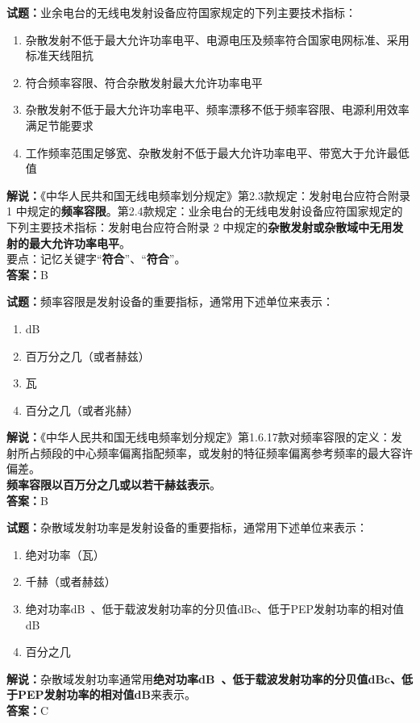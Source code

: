 \documentclass{ctexbook}
\begin{document}
\vspace{1em}

\textbf{试题：}业余电台的无线电发射设备应符国家规定的下列主要技术指标：
\begin{enumerate}[leftmargin=3em]
  \item 杂散发射不低于最大允许功率电平、电源电压及频率符合国家电网标准、采用标准天线阻抗
  \item 符合频率容限、符合杂散发射最大允许功率电平
  \item 杂散发射不低于最大允许功率电平、频率漂移不低于频率容限、电源利用效率满足节能要求
  \item 工作频率范围足够宽、杂散发射不低于最大允许功率电平、带宽大于允许最低值
\end{enumerate}
\noindent\textbf{解说：}《中华人民共和国无线电频率划分规定》第2.3款规定：发射电台应符合附录 1 中规定的\textbf{频率容限}。第2.4款规定：业余电台的无线电发射设备应符国家规定的下列主要技术指标：发射电台应符合附录 2 中规定的\textbf{杂散发射或杂散域中无用发射的最大允许功率电平}。\\要点：记忆关键字“\textbf{符合}”、“\textbf{符合}”。\\\noindent\textbf{答案：}B

\vspace{1em}

\textbf{试题：}频率容限是发射设备的重要指标，通常用下述单位来表示：
\begin{enumerate}[leftmargin=3em]
  \item dB
  \item 百万分之几（或者赫兹）
  \item 瓦
  \item 百分之几（或者兆赫）
\end{enumerate}
\noindent\textbf{解说：}《中华人民共和国无线电频率划分规定》第1.6.17款对频率容限的定义：发射所占频段的中心频率偏离指配频率，或发射的特征频率偏离参考频率的最大容许偏差。\\\textbf{频率容限以百万分之几或以若干赫兹表示}。\\\noindent\textbf{答案：}B

\vspace{1em}

\textbf{试题：}杂散域发射功率是发射设备的重要指标，通常用下述单位来表示：
\begin{enumerate}[leftmargin=3em]
  \item 绝对功率（瓦）
  \item 千赫（或者赫兹）%
  \item 绝对功率\unit[qualifier-mode=combine]{\deci\bel{}}、低于载波发射功率的分贝值dBc、低于PEP发射功率的相对值dB
  \item 百分之几
\end{enumerate}
\noindent\textbf{解说：}杂散域发射功率通常用\textbf{绝对功率\unit[qualifier-mode=combine]{\deci\bel{}}、低于载波发射功率的分贝值dBc、低于PEP发射功率的相对值dB}来表示。\\\noindent\textbf{答案：}C
\end{document}
